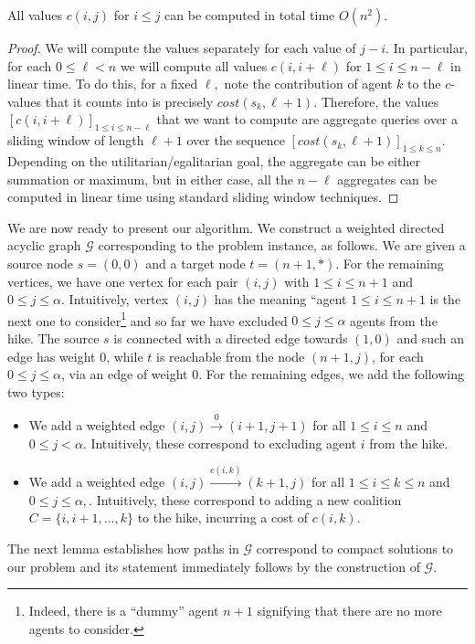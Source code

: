 \documentclass[a4paper]{article}
\newcommand{\calG}{\mathcal{G}}
\newcommand{\cost}{\mathit{cost}}
\begin{document}
\begin{lemma}\label{lemma:cost-precomputation} All values $c(i, j)$ for $i \leq j$ can be computed in total time $O(n^2).$
\end{lemma}
\begin{proof} We will compute the values separately for each value of $j - i.$ In particular, for each $0 \leq \ell < n$ we will compute all values $c(i, i + \ell)$ for $1 \leq i \leq n - \ell$ in linear time. To do this, for a fixed $\ell,$ note the contribution of agent $k$ to the $c$-values that it counts into is precisely $\cost(s_k,\ell + 1).$ Therefore, the values $[c(i, i + \ell)]_{1 \leq i \leq n - \ell}$ that we want to compute are aggregate queries over a sliding window of length $\ell + 1$ over the sequence $[\cost(s_k,\ell + 1)]_{1 \leq k \leq n}.$ Depending on the utilitarian/egalitarian goal, the aggregate can be either summation or maximum, but in either case, all the $n - \ell$ aggregates can be computed in linear time using standard sliding window techniques.
\end{proof}
We are now ready to present our algorithm. We construct a weighted directed acyclic graph $\calG$ corresponding to the problem instance, as follows. We are given a source node $s=(0,0)$ and a target node $ t= (n+1, *)$.
For the remaining vertices, we have one vertex for each pair $(i, j)$ with $1 \leq i \leq n + 1$ and $0 \leq j \leq \alpha$. Intuitively, vertex $(i, j)$ has the meaning ``agent $1 \leq i \leq n + 1$  is the next one to consider\footnote{Indeed, there is a ``dummy'' agent $n + 1$ signifying that there are no more agents to consider.} and so far we have excluded $0 \leq j \leq \alpha$ agents from the hike. 
The source $s$ is connected with a directed edge towards $(1,0)$ and such an edge has weight $0$, while $t$ is reachable from the node $(n+1, j)$, for each $0 \leq j \leq \alpha$, via an edge of weight $0$.
For the remaining edges, we add the following two types:
\begin{itemize}
\item We add a weighted edge $(i, j) \xrightarrow{0} (i + 1, j + 1)$ for all $1 \leq i \leq n$ and $0 \leq j < \alpha$. Intuitively, these correspond to excluding agent $i$ from the hike.
\item We add a weighted edge $(i, j) \xrightarrow{c(i, k)}(k + 1, j)$ for all $1 \leq i \leq k \leq n$ and $0 \leq j \leq \alpha,$. Intuitively, these correspond to adding a new coalition $C = \{i, i + 1, \ldots, k\}$ to the hike, incurring a cost of $c(i, k).$ 
\end{itemize}
\noindent The next lemma establishes how paths in $\calG$ correspond to compact solutions to our problem and its statement immediately follows by the construction of $\calG$.
\end{document}
